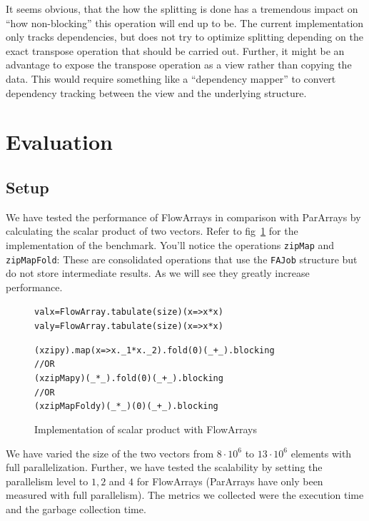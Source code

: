 \documentclass[runningheads,a4paper,fleqn]{llncs}
\begin{document}
It seems obvious, that the how the splitting is done has a tremendous
impact on ``how non-blocking'' this operation will end up to be. The
current implementation only tracks dependencies, but does not try to
optimize splitting depending on the exact transpose operation that
should be carried out. Further, it might be an advantage to expose the
transpose operation as a view rather than copying the data. This would
require something like a ``dependency mapper'' to convert dependency
tracking between the view and the underlying structure.

\section{Evaluation}
\label{sec:evaluation}

\subsection{Setup}

We have tested the performance of FlowArrays in comparison with
ParArrays by calculating the scalar product of two vectors. Refer to
fig~\ref{fig:scalar-product} for the implementation of the
benchmark. You'll notice the operations \texttt{zipMap} and
\texttt{zipMapFold}: These are consolidated operations that use the
\texttt{FAJob} structure but do not store intermediate results. As we
will see they greatly increase performance.

\begin{figure}
\begin{minipage}[t]{6cm}
\begin{alltt}
{\scriptsize
val x = FlowArray.tabulate(size)(x => x*x)
val y = FlowArray.tabulate(size)(x => x*x)

(x zip y).map(x => x._1 * x._2).fold(0)(_ + _).blocking
// OR
(x zipMap y)(_ * _).fold(0)(_ + _).blocking
// OR
(x zipMapFold y)(_ * _)(0)(_ + _).blocking
}
\end{alltt}
\end{minipage}
\caption{Implementation of scalar product with FlowArrays}
\label{fig:scalar-product}
\end{figure}

We have varied the size of the two vectors from $8 \cdot 10^6$ to $13
\cdot 10^6$ elements with full parallelization. Further, we have
tested the scalability by setting the parallelism level to $1,2$ and
$4$ for FlowArrays (ParArrays have only been measured with full
parallelism). The metrics we collected were the execution time and the
garbage collection time.
\end{document}
